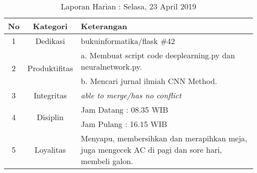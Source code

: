 \begin{table}[htp]
\begin{center}
\caption{Laporan Harian : Selasa, 23 April 2019}
\label{tab:lh230419}
\begin{tabularx}{\textwidth}{|l|l|X|}
\hline
\multicolumn{1}{|c|}{\textbf{No}} & \multicolumn{1}{c|}{\textbf{Kategori}} & \textbf{Keterangan} \\ \hline
\multicolumn{1}{|c|}{\multirow{1}{*}{1}} & \multicolumn{1}{c|}{\multirow{1}{*}{\parbox{2.5cm}{Dedikasi}}}
& bukuinformatika/flask \#42\\
\hline
\multicolumn{1}{|c|}{\multirow{2}{*}{2}} & \multicolumn{1}{c|}{\multirow{2}{*}{\parbox{2.5cm}{Produktifitas}}}
& a. Membuat script code deeplearning.py dan neuralnetwork.py.\\
\multicolumn{1}{|c|}{\multirow{1}{*}{}} & \multicolumn{1}{c|}{\multirow{1}{*}{\parbox{2.5cm}{}}}
& b. Mencari jurnal ilmiah CNN Method.\\
\hline
\multicolumn{1}{|c|}{\multirow{1}{*}{3}} & \multicolumn{1}{c|}{\multirow{1}{*}{\parbox{2.5cm}{Integritas}}}
& \textit{able to merge/has no conflict} \\
\hline
\multicolumn{1}{|c|}{\multirow{2}{*}{4}} & \multicolumn{1}{c|}{\multirow{2}{*}{\parbox{2.5cm}{Disiplin}}}
& Jam Datang : 08.35 WIB \\
\multicolumn{1}{|c|}{\multirow{1}{*}{}} & \multicolumn{1}{c|}{\multirow{1}{*}{\parbox{2.5cm}{}}}
& Jam Pulang : 16.15 WIB \\
\hline
\multicolumn{1}{|c|}{\multirow{2}{*}{5}} & \multicolumn{1}{c|}{\multirow{2}{*}{\parbox{2.5cm}{Loyalitas}}}
& Menyapu, membersihkan dan merapihkan meja, juga mengecek AC di pagi dan sore hari, membeli galon.\\
\hline
\end{tabularx}
\end{center}
\end{table}

